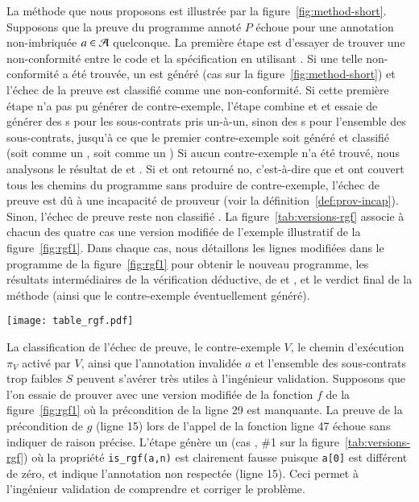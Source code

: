 La méthode que nous proposons est illustrée par la
figure~\ref{fig:method-short}.
Supposons que la preuve du programme annoté $P$ échoue pour une annotation
non-imbriquée $a\in{\ensuremath\mathcal{A}}$ quelconque.
La première étape est d'essayer de trouver une non-conformité entre le code et
la spécification en utilisant \NCD.
Si une telle non-conformité a été trouvée, un \NCCE est généré (cas 
sur la figure~\ref{fig:method-short}) et l'échec de la preuve est classifié
comme une non-conformité.
Si cette première étape n'a pas pu générer de contre-exemple, l'étape \SWD
combine \SSWD et \GSWD et essaie de générer des \SWCE{}s pour les sous-contrats
pris un-à-un, sinon des \SWCE{}s pour l'ensemble des sous-contrats, jusqu'à ce
que le premier contre-exemple soit généré et classifié (soit comme un \NCCE
{}, soit comme un \SWCE {})
Si aucun contre-exemple n'a été trouvé, nous analysons le résultat de \NCD et
\SWD.
Si \NCD et \SWD ont retourné \textsf{no}, c'est-à-dire que \NCD et \GSWD ont
couvert tous les chemins du programme sans produire de contre-exemple, l'échec
de preuve est dû à une incapacité de prouveur  (voir la
définition~\ref{def:prov-incap}).
Sinon, l'échec de preuve reste non classifié .
La figure~\ref{tab:versions-rgf} associe à chacun des quatre cas une version
modifiée de l'exemple illustratif de la figure~\ref{fig:rgf1}.
Dans chaque cas, nous détaillons les lignes modifiées dans le programme de la
figure~\ref{fig:rgf1} pour obtenir le nouveau programme, les résultats
intermédiaires de la vérification déductive, de \NCD et \SWD, et le verdict
final de la méthode (ainsi que le contre-exemple éventuellement généré).


\begin{figure*}[bt]\centering
  \texttt{[image: table\_rgf.pdf]}
  \caption{Résultats de la méthode sur différentes versions de l'exemple de la
    figure~\ref{fig:rgf1}.}
  \label{tab:versions-rgf}
\end{figure*}


La classification de l'échec de preuve, le contre-exemple $V$, le chemin
d'exécution $\pi_V$ activé par $V$, ainsi que l'annotation invalidée $a$ et
l'ensemble des sous-contrats trop faibles $S$ peuvent s'avérer très utiles à
l'ingénieur validation.
Supposons que l'on essaie de prouver avec \Wp une version modifiée de la
fonction $f$ de la figure~\ref{fig:rgf1} où la précondition de la ligne 29 est
manquante.
La preuve de la précondition de $g$ (ligne 15) lors de l'appel de la fonction
ligne 47 échoue sans indiquer de raison précise. 
L'étape \NCD génère un \NCCE (cas , \#1 sur la
figure~\ref{tab:versions-rgf}) où la propriété \lstinline'is_rgf(a,n)' est
clairement fausse puisque \lstinline'a[0]' est différent de zéro, et indique
l'annotation non respectée (ligne 15).
Ceci permet à l'ingénieur validation de comprendre et corriger le problème.

